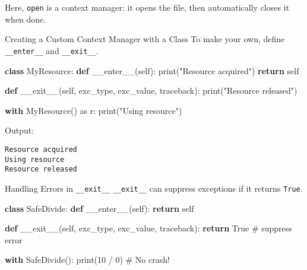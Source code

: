 \documentclass[
  letterpaper,
  DIV=11,
  numbers=noendperiod]{scrreprt}
\newenvironment{Shaded}{\begin{snugshade}}{\end{snugshade}}
\newcommand{\BuiltInTok}[1]{\textcolor[rgb]{0.00,0.23,0.31}{#1}}
\newcommand{\CommentTok}[1]{\textcolor[rgb]{0.37,0.37,0.37}{#1}}
\newcommand{\ControlFlowTok}[1]{\textcolor[rgb]{0.00,0.23,0.31}{\textbf{#1}}}
\newcommand{\DecValTok}[1]{\textcolor[rgb]{0.68,0.00,0.00}{#1}}
\newcommand{\FunctionTok}[1]{\textcolor[rgb]{0.28,0.35,0.67}{#1}}
\newcommand{\ImportTok}[1]{\textcolor[rgb]{0.00,0.46,0.62}{#1}}
\newcommand{\KeywordTok}[1]{\textcolor[rgb]{0.00,0.23,0.31}{\textbf{#1}}}
\newcommand{\NormalTok}[1]{\textcolor[rgb]{0.00,0.23,0.31}{#1}}
\newcommand{\OperatorTok}[1]{\textcolor[rgb]{0.37,0.37,0.37}{#1}}
\newcommand{\StringTok}[1]{\textcolor[rgb]{0.13,0.47,0.30}{#1}}
\newcommand{\VariableTok}[1]{\textcolor[rgb]{0.07,0.07,0.07}{#1}}
\begin{document}
Here, \texttt{open} is a context manager: it opens the file, then
automatically closes it when done.

Creating a Custom Context Manager with a Class To make your own, define
\texttt{\_\_enter\_\_} and \texttt{\_\_exit\_\_}.

\begin{Shaded}
\begin{Highlighting}[]
\KeywordTok{class}\NormalTok{ MyResource:}
    \KeywordTok{def} \FunctionTok{\_\_enter\_\_}\NormalTok{(}\VariableTok{self}\NormalTok{):}
        \BuiltInTok{print}\NormalTok{(}\StringTok{"Resource acquired"}\NormalTok{)}
        \ControlFlowTok{return} \VariableTok{self}
    
    \KeywordTok{def} \FunctionTok{\_\_exit\_\_}\NormalTok{(}\VariableTok{self}\NormalTok{, exc\_type, exc\_value, traceback):}
        \BuiltInTok{print}\NormalTok{(}\StringTok{"Resource released"}\NormalTok{)}

\ControlFlowTok{with}\NormalTok{ MyResource() }\ImportTok{as}\NormalTok{ r:}
    \BuiltInTok{print}\NormalTok{(}\StringTok{"Using resource"}\NormalTok{)}
\end{Highlighting}
\end{Shaded}

Output:

\begin{verbatim}
Resource acquired
Using resource
Resource released
\end{verbatim}

Handling Errors in \texttt{\_\_exit\_\_} \texttt{\_\_exit\_\_} can
suppress exceptions if it returns \texttt{True}.

\begin{Shaded}
\begin{Highlighting}[]
\KeywordTok{class}\NormalTok{ SafeDivide:}
    \KeywordTok{def} \FunctionTok{\_\_enter\_\_}\NormalTok{(}\VariableTok{self}\NormalTok{):}
        \ControlFlowTok{return} \VariableTok{self}
    
    \KeywordTok{def} \FunctionTok{\_\_exit\_\_}\NormalTok{(}\VariableTok{self}\NormalTok{, exc\_type, exc\_value, traceback):}
        \ControlFlowTok{return} \VariableTok{True}   \CommentTok{\# suppress error}

\ControlFlowTok{with}\NormalTok{ SafeDivide():}
    \BuiltInTok{print}\NormalTok{(}\DecValTok{10} \OperatorTok{/} \DecValTok{0}\NormalTok{)   }\CommentTok{\# No crash!}
\end{Highlighting}
\end{Shaded}
\end{document}
